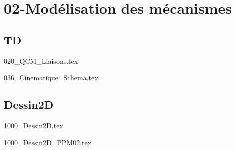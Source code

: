 \clearpage
\chapter{02-Modélisation des mécanismes}

\section{TD}

\setcounter{question}{0}
{}
\graphicspath{{../02-Modélisation des mécanismes/TD/020_QCM_Liaisons/images/}{../02-Modélisation des mécanismes/TD/020_QCM_Liaisons/}{../Style/png/}}
{020_QCM_Liaisons.tex}

\setcounter{question}{0}
{}
\graphicspath{{../02-Modélisation des mécanismes/TD/036_Cinematique_Schema/images/}{../02-Modélisation des mécanismes/TD/036_Cinematique_Schema/}{../Style/png/}}
{036_Cinematique_Schema.tex}

\section{Dessin2D}

\setcounter{question}{0}
{}
\graphicspath{{../02-Modélisation des mécanismes/TD/Dessin2D/1000_Dessin2D/images/}{../02-Modélisation des mécanismes/TD/Dessin2D/1000_Dessin2D/}{../Style/png/}}
{1000_Dessin2D.tex}

\setcounter{question}{0}
{}
\graphicspath{{../02-Modélisation des mécanismes/TD/Dessin2D/1000_Dessin2D_PPM02/images/}{../02-Modélisation des mécanismes/TD/Dessin2D/1000_Dessin2D_PPM02/}{../Style/png/}}
{1000_Dessin2D_PPM02.tex}

